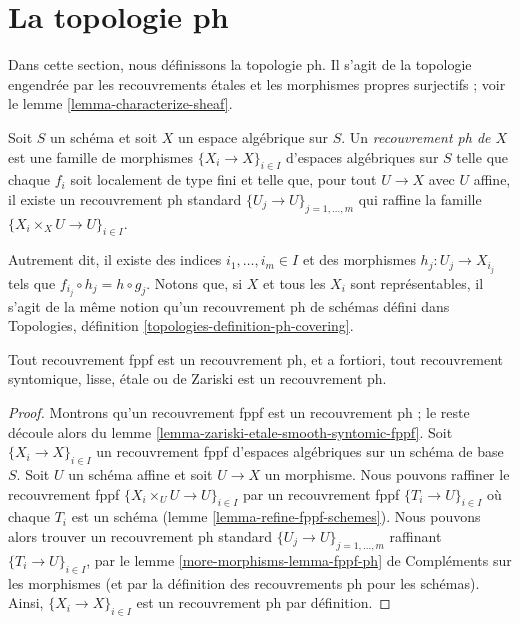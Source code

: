 \section{La topologie ph}
\label{section-ph}

\noindent
Dans cette section, nous définissons la topologie ph. Il s'agit de la topologie
engendrée par les recouvrements \'etales et les morphismes propres surjectifs ; voir
le lemme \ref{lemma-characterize-sheaf}.

\begin{definition}
\label{definition-ph-covering}
Soit $S$ un schéma et soit $X$ un espace algébrique sur $S$.
Un {\it recouvrement ph de $X$} est une famille
de morphismes $\{X_i \to X\}_{i \in I}$ d'espaces algébriques sur $S$
telle que chaque $f_i$ soit localement de type fini et telle que, pour tout
$U \to X$ avec $U$ affine, il existe un recouvrement ph standard
$\{U_j \to U\}_{j = 1, \ldots, m}$ qui raffine la famille
$\{X_i \times_X U \to U\}_{i \in I}$.
\end{definition}

\noindent
Autrement dit, il existe des indices $i_1, \ldots, i_m \in I$ et des
morphismes $h_j : U_j \to X_{i_j}$ tels que
$f_{i_j} \circ h_j = h \circ g_j$. Notons que, si $X$ et tous les $X_i$ sont
représentables, il s'agit de la même notion qu'un recouvrement ph de schémas défini dans
Topologies, définition \ref{topologies-definition-ph-covering}.

\begin{lemma}
\label{lemma-zariski-etale-smooth-syntomic-fppf-ph}
Tout recouvrement fppf est un recouvrement ph, et a fortiori,
tout recouvrement syntomique, lisse, \'etale ou de Zariski est un recouvrement ph.
\end{lemma}

\begin{proof}
Montrons qu'un recouvrement fppf est un recouvrement ph ; le
reste découle alors du lemme \ref{lemma-zariski-etale-smooth-syntomic-fppf}.
Soit $\{X_i \to X\}_{i \in I}$ un recouvrement fppf d'espaces algébriques
sur un schéma de base $S$. Soit $U$ un schéma affine et soit
$U \to X$ un morphisme. Nous pouvons raffiner le recouvrement fppf
$\{X_i \times_U U \to U\}_{i \in I}$ par un recouvrement fppf
$\{T_i \to U\}_{i \in I}$ où chaque $T_i$ est un schéma
(lemme \ref{lemma-refine-fppf-schemes}).
Nous pouvons alors trouver un recouvrement ph standard $\{U_j \to U\}_{j = 1, \ldots, m}$
raffinant $\{T_i \to U\}_{i \in I}$, par le
lemme \ref{more-morphisms-lemma-fppf-ph} de Compléments sur les morphismes
(et par la définition des recouvrements ph pour les schémas).
Ainsi, $\{X_i \to X\}_{i \in I}$ est un recouvrement ph par définition.
\end{proof}

